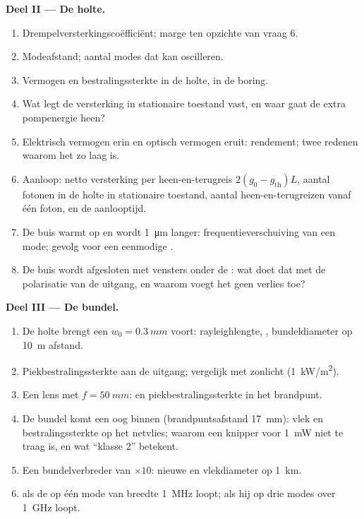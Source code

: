 \begin{problem}
\textbf{Deel II --- De holte.}
\begin{enumerate}[resume]
  \item Drempelversterkingscoëfficiënt; marge ten opzichte van vraag 6.
  \item Modeafstand; aantal modes dat kan oscilleren.
  \item Vermogen en bestralingssterkte in de holte, in de boring.
  \item Wat legt de versterking in stationaire toestand vast, en waar gaat de extra
        pompenergie heen?
  \item Elektrisch vermogen erin en optisch vermogen eruit: rendement; twee
        redenen waarom het zo laag is.
  \item Aanloop: netto versterking per heen-en-terugreis $2(g_0 - g_{\text{th}})L$,
        aantal fotonen in de holte in stationaire toestand, aantal
        heen-en-terugreizen vanaf één foton, en de aanlooptijd.
  \item De buis warmt op en wordt \qty{1}{\micro m} langer: frequentieverschuiving
        van een mode; gevolg voor een eenmodige .
  \item De buis wordt afgesloten met vensters onder de : wat doet
        dat met de polarisatie van de uitgang, en waarom voegt het geen
        verlies toe?
\end{enumerate}

\textbf{Deel III --- De bundel.}
\begin{enumerate}[resume]
  \item De holte brengt een  $w_0 = \qty{0.3}{mm}$ voort: rayleigh\-lengte,
        , bundeldiameter op \qty{10}{m} afstand.
  \item Piekbestralingssterkte aan de uitgang; vergelijk met zonlicht
        (\qty{1}{kW/m^2}).
  \item Een lens met $f = \qty{50}{mm}$:  en piekbestralingssterkte in het
        brandpunt.
  \item De bundel komt een oog binnen (brandpuntsafstand \qty{17}{mm}): vlek en
        bestralingssterkte op het netvlies; waarom een knipper voor
        \qty{1}{mW} niet te traag is,
        en wat ``klasse 2'' betekent.
  \item Een bundelverbreder van $\times 10$: nieuwe  en vlekdiameter
        op \qty{1}{km}.
  \item {} als de  op één mode van breedte
        \qty{1}{MHz} loopt; als hij op drie modes over \qty{1}{GHz} loopt.
\end{enumerate}


\end{problem}
